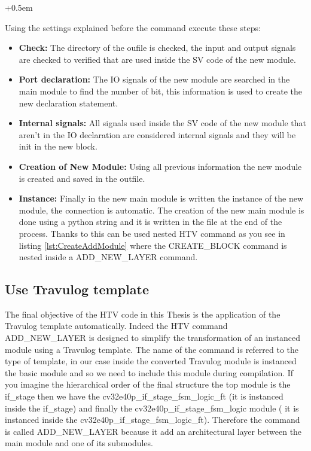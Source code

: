 {{{    		
    		\openup +0.5em
           
            Using the settings explained before the command execute these steps:
            \begin{itemize}
                \item \textbf{Check:} The directory of the oufile is checked, the input and output signals are checked to verified that are used inside the SV code of the new module.
                \item \textbf{Port declaration:} The IO signals of the new module are searched in the main module to find the number of bit, this information is used to create the new declaration statement.
                \item \textbf{Internal signals:} All signals used inside the SV code of the new module that aren't in the IO declaration are considered internal signals and they will be init in the new block.
                \item \textbf{Creation of New Module:} Using all previous information the new module is created and saved in the outfile.
                \item \textbf{Instance:} Finally in the new main module is written the instance of the new module, the connection is automatic. The creation of the new main module is done using a python string and it is written in the file at the end of the process. Thanks to this can be used nested HTV command as you see in listing \ref{lst:CreateAddModule} where the CREATE\_BLOCK command is nested inside a ADD\_NEW\_LAYER command.
            \end{itemize}
            
            
        }%
        \subsection{Use Travulog template}{
            \label{AddModuleLayer}
        
            The final objective of the HTV code in this Thesis is the application of the Travulog template automatically.
            Indeed the HTV command ADD\_NEW\_LAYER is designed to simplify the transformation of an instanced module using a Travulog template.
            The name of the command is referred to the type of template, in our case inside the converted Travulog module is instanced the basic module and so we need to include this module during compilation. If you imagine the hierarchical order of the final structure the top module is the if\_stage then we have the cv32e40p\_if\_stage\_fsm\_logic\_ft (it is instanced inside the if\_stage) and finally the cv32e40p\_if\_stage\_fsm\_logic module ( it is instanced inside the cv32e40p\_if\_stage\_fsm\_logic\_ft). 
            Therefore the command is called ADD\_NEW\_LAYER because it add an architectural layer between the main module and one of its submodules.\\
            
}}}
